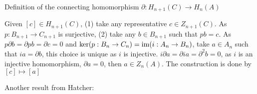 \documentclass{article}
\begin{document}
\begin{definition}[$\partial: H_{n+1}(C) \to H_n(A)$]
    Definition of the connecting homomorphism $\partial: H_{n+1}(C) \to H_n(A)$
    \begin{center}
    \end{center}
    
    Given $[c] \in H_{n+1}(C)$, (1) take any representative $c \in Z_{n+1}(C)$. As $p: B_{n+1} \to C_{n+1}$ is surjective, (2) take any $b \in B_{n+1}$ such that $pb = c$. As $p \partial b = \partial pb = \partial c = 0$ and $\ker (p: B_n \to C_n) = \operatorname{im} (i: A_n \to B_n)$, take $a \in A_n$ such that $ia = \partial b$, this choice is unique as $i$ is injective. $i \partial a = \partial i a = \partial^2 b = 0$, as $i$ is an injective homomorphism, $\partial a = 0$, then $a \in Z_n(A)$. The construction is done by $[c] \mapsto [a]$
\end{definition}

Another result from Hatcher:
\end{document}
